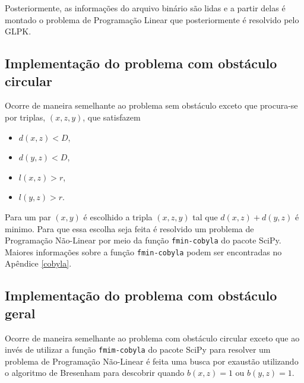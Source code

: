 Posteriormente, as informações do arquivo binário são lidas e a partir delas é montado o
problema de Programação Linear que posteriormente é resolvido pelo GLPK.

\subsection{Implementação do problema com obstáculo circular}
Ocorre de maneira semelhante ao problema sem obstáculo exceto que procura-se
por triplas, $(x, z, y)$, que satisfazem 
\begin{itemize}
    \item $d(x, z) < D$,
    \item $d(y, z) < D$,
    \item $l(x, z) > r$,
    \item $l(y, z) > r$.
\end{itemize}

Para um par $(x, y)$ é escolhido a tripla $(x, z, y)$ tal que $d(x, z) + d(y,
z)$ é minimo. Para que essa escolha seja feita é resolvido um problema de
Programação Não-Linear por meio da função \texttt{fmin-cobyla} do pacote SciPy.
Maiores
informações sobre a função \texttt{fmin-cobyla} podem ser encontradas no
Apêndice \ref{cobyla}.

\subsection{Implementação do problema com obstáculo geral}
Ocorre de maneira semelhante ao problema com obstáculo circular exceto que ao
invés de utilizar a função \texttt{fmim-cobyla} do pacote SciPy para resolver
um problema de Programação Não-Linear é feita uma busca por exaustão utilizando
o algoritmo de Bresenham para descobrir quando $b(x, z) = 1$ ou $b(y, z) = 1$.
